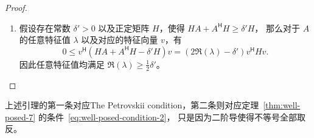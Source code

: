 \begin{proof}
\begin{enumerate}
\[                  \ge{}  2 \delta I + D_\varepsilon^{-1} B D_\varepsilon + D_\varepsilon^{\mathsf{H}} B^{\mathsf{H}} D_\varepsilon^{-\mathsf{H}}.
              \]
              由于 $\|D_\varepsilon^{-1} B D_\varepsilon\| = \mathcal{O}(\varepsilon)$，
              显然存在 $\varepsilon_0 > 0$，使得当$ 0 < \varepsilon < \varepsilon_0$ 足够小时
              \[
                  \widetilde{A}_\varepsilon + \widetilde{A}^{\mathsf{H}}_\varepsilon \ge \delta I.
              \]
              因此
              \begin{gather*}
                  (U D_\varepsilon)^{-\mathsf{H}} (\widetilde{A}_\varepsilon + A^{\mathsf{H}}_\varepsilon) (U D_\varepsilon)^{-1} \ge \delta\,(U D_\varepsilon)^{-\mathsf{H}} (U D_\varepsilon)^{-1}.
                  \\
                  (U D_\varepsilon)^{-\mathsf{H}} (U D_\varepsilon)^{-1} A + A^{\mathsf{H}} (U D_\varepsilon)^{-\mathsf{H}} (U D_\varepsilon)^{-1} \ge \delta\,(U D_\varepsilon)^{-\mathsf{H}} (U D_\varepsilon)^{-1}.
              \end{gather*}
              取 $H = (U D_\varepsilon)^{-\mathsf{H}} (U D_\varepsilon)^{-1}$ 即可完成证明。
        \item 假设存在常数 $\delta' >0$ 以及正定矩阵 $H$，使得 $H A + A^{\mathsf{H}} H \ge \delta' H$，
              那么对于 $A$ 的任意特征值 $\lambda$ 以及对应的特征向量 $v$，有
              \[
                  0 \le v^{\mathsf{H}} (H A + A^{\mathsf{H}} H - \delta' H) v =  (2 \Re(\lambda) - \delta') v^{\mathsf{H}} H v.
              \]
              因此任意特征值均满足 $\Re(\lambda) \ge \frac12\delta'$。
    \end{enumerate}
\end{proof}

\begin{remark}
    上述引理的第一条对应The Petrovskii condition，第二条则对应定理~\ref{thm:well-posed-7} 的条件~\eqref{eq:well-posed-condition-2}，
    只是因为二阶导使得不等号全部取反。
\end{remark}

